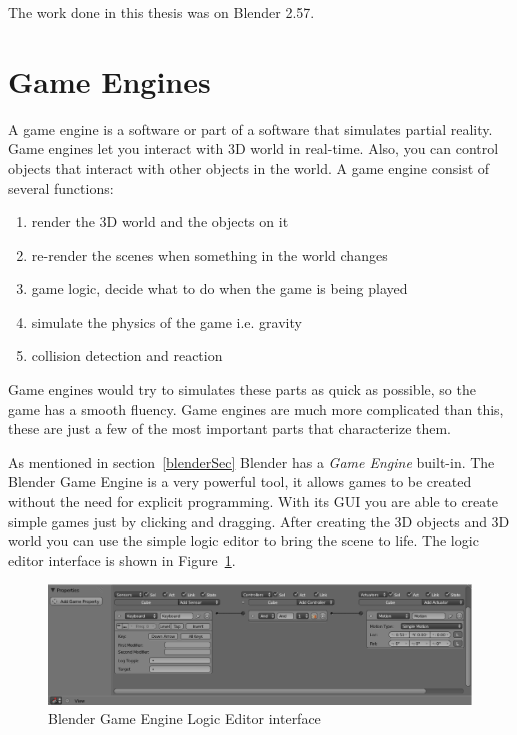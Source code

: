 The work done in this thesis was on Blender 2.57.

\section{Game Engines}

A game engine is a software or part of a software that simulates partial reality\cite{bookGameKit2}. Game engines let you interact with 3D world in real-time. Also, you can control objects that interact with other objects in the world. A game engine consist of several functions:
\begin{enumerate}
\item{render the 3D world and the objects on it}
\item{re-render the scenes when something in the world changes}
\item{game logic, decide what to do when the game is being played}
\item{simulate the physics of the game i.e. gravity}
\item{collision detection and reaction}
\end{enumerate}

Game engines would try to simulates these parts as quick as possible, so the game has a smooth fluency. Game engines are much more complicated than this, these are just a few of the most important parts that characterize them.

As mentioned in section~\ref{blenderSec} Blender has a \textit{Game Engine} built-in. The Blender Game Engine is a very powerful tool, it allows games to be created without  the need for explicit programming. With its GUI you are able to create simple games just by clicking and dragging. After creating the 3D objects and 3D world you can use the simple logic editor to bring the scene to life. The logic editor interface is shown in Figure~\ref{logic}.

\begin{figure}[htbp]
\begin{center}
\includegraphics[scale=0.4]{figures/logic.eps}
\caption{Blender Game Engine Logic Editor interface}
\label{logic}
\end{center}
\end{figure}

